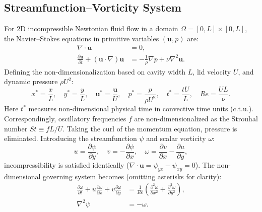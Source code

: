 \documentclass[11pt,a4paper]{article}
\begin{document}
\subsection{Streamfunction--Vorticity System}
For 2D incompressible Newtonian fluid flow in a domain $\Omega = [0, L] \times [0, L]$, the Navier--Stokes equations in primitive variables $(\mathbf{u}, p)$ are:
\begin{align}
    \nabla \cdot \mathbf{u} &= 0, \\
    \frac{\partial \mathbf{u}}{\partial t} + (\mathbf{u} \cdot \nabla)\mathbf{u} &= -\frac{1}{\rho}\nabla p + \nu \nabla^2 \mathbf{u}.
\end{align}
Defining the non-dimensionalization based on cavity width $L$, lid velocity $U$, and dynamic pressure $\rho U^2$:
\begin{equation}
    x^* = \frac{x}{L}, \quad y^* = \frac{y}{L}, \quad \mathbf{u}^* = \frac{\mathbf{u}}{U}, \quad p^* = \frac{p}{\rho U^2}, \quad t^* = \frac{t U}{L}, \quad Re = \frac{U L}{\nu}.
\end{equation}
Here $t^*$ measures non-dimensional physical time in convective time units (c.t.u.). Correspondingly, oscillatory frequencies $f$ are non-dimensionalized as the Strouhal number $St \equiv f L / U$. Taking the curl of the momentum equation, pressure is eliminated. Introducing the streamfunction $\psi$ and scalar vorticity $\omega$:
\begin{equation}
    u = \frac{\partial \psi}{\partial y}, \quad v = -\frac{\partial \psi}{\partial x}, \quad \omega = \frac{\partial v}{\partial x} - \frac{\partial u}{\partial y},
\end{equation}
incompressibility is satisfied identically ($\nabla \cdot \mathbf{u} = \psi_{yx} - \psi_{xy} = 0$). The non-dimensional governing system becomes (omitting asterisks for clarity):
\begin{align}
    \frac{\partial \omega}{\partial t} + u \frac{\partial \omega}{\partial x} + v \frac{\partial \omega}{\partial y} &= \frac{1}{Re} \left( \frac{\partial^2 \omega}{\partial x^2} + \frac{\partial^2 \omega}{\partial y^2} \right), \label{eq:vorticity_transport} \\
    \nabla^2 \psi &= -\omega. \label{eq:poisson_psi}
\end{align}
\end{document}
